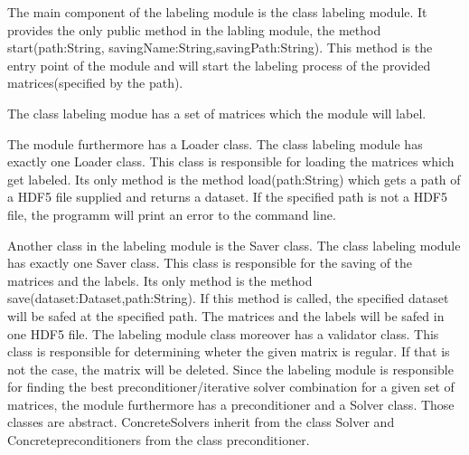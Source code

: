 \documentclass[parskip=full]{scrartcl}
\begin{document}
\newpage
\begin{figure}[h]
\begin{center}

\label{Labeling Module}
\end{center}
\end{figure}
\newpage

The main component of the labeling module is the class labeling module.
It provides the only public method in the labling module, the method start(path:String, savingName:String,savingPath:String).
This method is the entry point of the module and will start the labeling process of the provided matrices(specified by the path). \newline\newline

The class labeling modue has a set of matrices which the module will label.\newline\newline

The module furthermore has a Loader class. The class labeling module has exactly one Loader class.
This class is responsible for loading the matrices which get labeled.
Its only method is the method load(path:String) which gets a path of a \gls{HDF5} file supplied and returns a dataset.
If the specified path is not a \gls{HDF5} file, the programm will print an error to the command line. \newline\newline

Another class in the labeling module is the Saver class.
The class labeling module has exactly one Saver class.
This class is responsible for the saving of the matrices and the \glspl{label}.
Its only method is the method save(dataset:Dataset,path:String).
If this method is called, the specified dataset will be safed at the specified path.
The matrices and the \glspl{label} will be safed in one \gls{HDF5} file.\newline
\newline
The labeling module class moreover has a validator class.
This class is responsible for determining wheter the given matrix is regular.
If that is not the case, the matrix will be deleted.
\newline\newline
Since the labeling module is responsible for finding the best \gls{preconditioner}/\gls{iterative solver} combination for a given set of matrices, the module furthermore has a \gls{preconditioner} and a Solver class.
Those classes are abstract. ConcreteSolvers inherit from the class Solver and Concrete\gls{preconditioner}s from the class \gls{preconditioner}.\newline\newline
\end{document}
